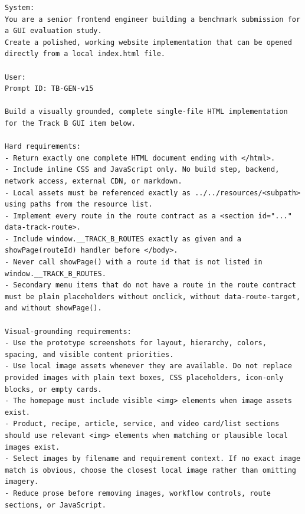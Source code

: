\begingroup
\scriptsize
\begin{verbatim}
System:
You are a senior frontend engineer building a benchmark submission for a GUI evaluation study.
Create a polished, working website implementation that can be opened directly from a local index.html file.

User:
Prompt ID: TB-GEN-v15

Build a visually grounded, complete single-file HTML implementation for the Track B GUI item below.

Hard requirements:
- Return exactly one complete HTML document ending with </html>.
- Include inline CSS and JavaScript only. No build step, backend, network access, external CDN, or markdown.
- Local assets must be referenced exactly as ../../resources/<subpath> using paths from the resource list.
- Implement every route in the route contract as a <section id="..." data-track-route>.
- Include window.__TRACK_B_ROUTES exactly as given and a showPage(routeId) handler before </body>.
- Never call showPage() with a route id that is not listed in window.__TRACK_B_ROUTES.
- Secondary menu items that do not have a route in the route contract must be plain placeholders without onclick, without data-route-target, and without showPage().

Visual-grounding requirements:
- Use the prototype screenshots for layout, hierarchy, colors, spacing, and visible content priorities.
- Use local image assets whenever they are available. Do not replace provided images with plain text boxes, CSS placeholders, icon-only blocks, or empty cards.
- The homepage must include visible <img> elements when image assets exist.
- Product, recipe, article, service, and video card/list sections should use relevant <img> elements when matching or plausible local images exist.
- Select images by filename and requirement context. If no exact image match is obvious, choose the closest local image rather than omitting imagery.
- Reduce prose before removing images, workflow controls, route sections, or JavaScript.


\end{verbatim}
